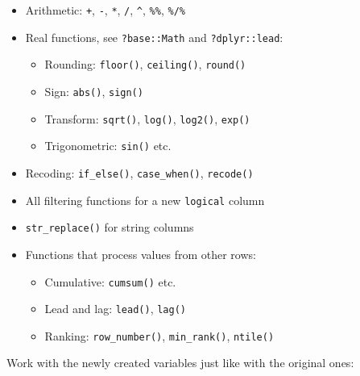 \documentclass[]{book}
\newenvironment{Shaded}{}{}
\newcommand{\CommentTok}[1]{\textcolor[rgb]{0.00,0.50,0.00}{#1}}
\newcommand{\DecValTok}[1]{#1}
\newcommand{\KeywordTok}[1]{\textcolor[rgb]{0.00,0.00,1.00}{#1}}
\newcommand{\NormalTok}[1]{#1}
\newcommand{\OperatorTok}[1]{#1}
\newcommand{\StringTok}[1]{\textcolor[rgb]{0.00,0.50,0.50}{#1}}
\providecommand{\tightlist}{%
  \setlength{\itemsep}{0pt}\setlength{\parskip}{0pt}}
\begin{document}
\begin{itemize}
\item
  Arithmetic: \texttt{+}, \texttt{-}, \texttt{*}, \texttt{/}, \texttt{\^{}}, \texttt{\%\%}, \texttt{\%/\%}

\begin{Shaded}
\end{Shaded}
\item
  Real functions, see \texttt{?base::Math} and \texttt{?dplyr::lead}:

  \begin{itemize}
  \tightlist
  \item
    Rounding: \texttt{floor()}, \texttt{ceiling()}, \texttt{round()}
  \item
    Sign: \texttt{abs()}, \texttt{sign()}
  \item
    Transform: \texttt{sqrt()}, \texttt{log()}, \texttt{log2()}, \texttt{exp()}
  \item
    Trigonometric: \texttt{sin()} etc.
  \end{itemize}
\item
  Recoding: \texttt{if\_else()}, \texttt{case\_when()}, \texttt{recode()}
\item
  All filtering functions for a new \texttt{logical} column
\item
  \texttt{str\_replace()} for string columns
\item
  Functions that process values from other rows:

  \begin{itemize}
  \tightlist
  \item
    Cumulative: \texttt{cumsum()} etc.
  \item
    Lead and lag: \texttt{lead()}, \texttt{lag()}
  \item
    Ranking: \texttt{row\_number()}, \texttt{min\_rank()}, \texttt{ntile()}
  \end{itemize}
\end{itemize}

Work with the newly created variables just like with the original ones:
\end{document}
